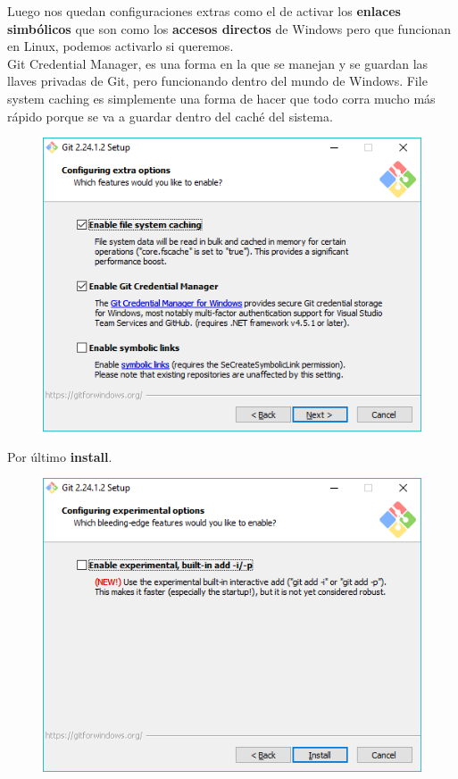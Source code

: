 \documentclass{article}
\begin{document}
\newpage

Luego nos quedan configuraciones extras como el de activar los \textbf{enlaces
simbólicos} que son como los \textbf{accesos directos} de Windows pero que
funcionan en Linux, podemos activarlo si queremos.\\

Git Credential Manager, es una forma en la que se manejan y se guardan las
llaves privadas de Git, pero funcionando dentro del mundo de Windows. File
system caching es simplemente una forma de hacer que todo corra mucho más
rápido porque se va a guardar dentro del caché del sistema.


\begin{figure}[h!]
  \centering
  \includegraphics[scale=0.65]{./Pictures/021_install_git.png}
\end{figure}

Por último \textbf{install}.

\begin{figure}[h!]
  \centering
  \includegraphics[scale=0.65]{./Pictures/022_install_git.png}
\end{figure}
\end{document}
